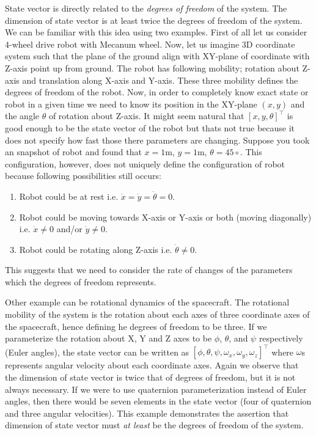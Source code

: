 \documentclass{article}
\begin{document}
State vector is directly related to the \textit{degrees of freedom} of the system. The dimension of state vector is at least twice the degrees of freedom of the system. We can be familiar with this idea using two examples. First of all let us consider 4-wheel drive robot with Mecanum wheel. Now, let us imagine 3D coordinate system such that the plane of the ground align with XY-plane of coordinate with Z-axis point up from ground.  The robot has following mobility; rotation about Z-axis and translation along X-axis and Y-axis. These three mobility defines the degrees of freedom of the robot. Now, in order to completely know exact state or robot in a given time we need to know its position in the XY-plane $(x, y)$ and the angle $\theta$ of rotation about Z-axis. It might seem natural that $[x, y, \theta]^\intercal$ is good enough to be the state vector of the robot but thats not true because it does not specify how fast those there parameters are changing. Suppose you took an snapshot of robot and found that $x=1$m, $y=1$m, $\theta=45\circ$. This configuration, however, does not uniquely define the configuration of robot because following possibilities still occurs:
\begin{enumerate}[noitemsep]
  \item Robot could be at rest i.e. $\dot{x} = \dot{y} = \dot{\theta} = 0$.
  \item Robot could be moving towards X-axis or Y-axis or both (moving diagonally) i.e. $\dot{x} \neq 0$ and/or $\dot{y} \neq 0$.
  \item Robot could be rotating along Z-axis i.e. $\dot{\theta} \neq 0$.
\end{enumerate}

This suggests that we need to consider the rate of changes of the parameters which the degrees of freedom represents. 

Other example can be rotational dynamics of the spacecraft. The rotational mobility  of the system is the rotation about each axes of three coordinate axes of the spacecraft, hence defining he degrees of freedom to be three. If we parameterize the rotation about X, Y and Z axes to be $\phi$, $\theta$, and $\psi$ respectively (Euler angles), the state vector can be written as $[\phi, \theta, \psi, \omega_{x}, \omega_{y}, \omega_{z}]^\intercal$ where $\omega$s represents angular velocity about each coordinate axes. Again we observe that the dimension of state vector is twice that of degrees of freedom, but it is not always necessary. If we were to use quaternion parameterization instead of Euler angles, then there would be seven elements in the state vector (four of quaternion and three angular velocities).  This example demonstrates the assertion that dimension of state vector must \textit{at least} be the degrees of freedom of the system.
\end{document}
